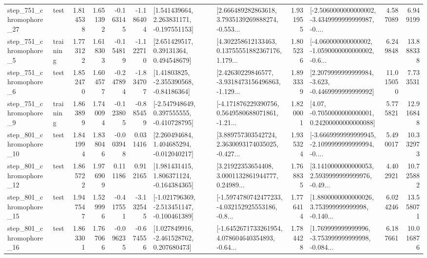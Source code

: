 \begin{tabular}{llrrrrllrlrr}
  step\_751\_chromophore\_27 &      test &      1.814538 &    1.651392 &     -0.163145 & -1.186404 &    [1.541439664, 2.263831171, -0.197551153] &  [2.666489282863618, 3.7935139269888274, -0.553... &       1.931955 &  [-2.5060000000000002, -3.4349999999999987, -0.... &            4.587089 &          6.949199 \\
   step\_751\_chromophore\_5 &  training &      1.773122 &    1.618303 &     -0.154819 & -1.122710 &      [2.651429517, 0.39131364, 0.494548679] &  [4.302258612133463, 0.13755551882367176, 1.179... &       1.805236 &  [-4.060000000000002, -1.0590000000000002, -0.6... &            6.249848 &         13.888338 \\
   step\_751\_chromophore\_6 &      test &      1.852470 &    1.604577 &     -0.247894 & -1.834707 &     [1.41803825, -2.355390568, -0.84186364] &  [2.42630229846577, -3.9318473156496863, -1.129... &       1.893339 &  [2.2079999999999984, -3.623, -0.4469999999999992] &           11.015050 &          7.733531 \\
   step\_751\_chromophore\_9 &  training &      1.863899 &    1.740094 &     -0.123805 & -0.885459 &   [-2.547948649, 0.397555555, -0.410728795] &  [-4.171876229390756, 0.5649580688071861, -1.21... &       1.820001 &   [4.07, -0.7050000000000001, 0.24200000000000088] &            5.775821 &         12.916848 \\
  step\_801\_chromophore\_10 &      test &      1.841994 &    1.838046 &     -0.003948 &  0.031416 &    [2.260494684, 1.404685294, -0.012040217] &  [3.889757303542724, 2.3630093174035025, -0.427... &       1.935324 &  [-3.6669999999999945, -2.1099999999999994, -0.... &            5.490017 &         10.332973 \\
  step\_801\_chromophore\_12 &      test &      1.865722 &    1.976909 &      0.111186 &  0.912165 &    [1.981431415, 1.806371124, -0.164384365] &  [3.21922353654408, 3.0001132861944777, 0.24989... &       1.768835 &  [3.1410000000000053, 2.5939999999999976, -0.49... &            4.402921 &         10.725882 \\
  step\_801\_chromophore\_15 &      test &      1.947547 &    1.529996 &     -0.417551 & -3.132545 &  [-1.021796369, -2.513451147, -0.100461389] &  [-1.5974780742477233, -4.032152925553186, -0.8... &       1.776414 &  [1.8800000000000026, 3.753999999999998, -0.140... &            6.024246 &         13.558071 \\
  step\_801\_chromophore\_16 &      test &      1.863301 &    1.767066 &     -0.096235 & -0.674556 &    [1.027849916, -2.461528762, 0.207680473] &  [-1.6452671733261954, 4.078604640354893, -0.64... &       1.784428 &  [1.769999999999996, -3.753999999999998, -0.084... &            6.187661 &         10.016876 \\

\end{tabular}
